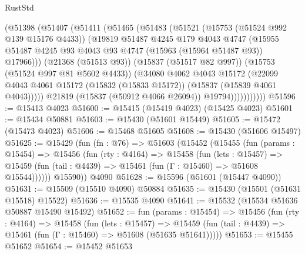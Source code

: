 \begin{lexlean}{RustStd}
\begin{coremodule}
                  (@51398
                    (@51407
                      (@51411
                        (@51465
                          (@51483
                            (@51521
                              (@15753 (@51524 @992 @139 @15176 @4433))
                              (@19819
                                @51487
                                @4245
                                @179
                                @4043
                                @4747
                                (@15955
                                  @51487
                                  @4245
                                  @93
                                  @4043
                                  @93
                                  @4747
                                  (@15963 (@15964 @51487 @93))
                                  @17966)))
                            (@21368 (@51513 @93))
                            (@15837 (@51517 @82 @997))
                            (@15753 (@51524 @997 @81 @5602 @4433))
                            (@34080
                              @4062
                              @4043
                              @15172
                              (@22099
                                @4043
                                @4061
                                @15172
                                (@15832 (@15833 @15172))
                                (@15837 (@15839 @4061 @4043)))))
                          @21819
                          (@15837 (@50912 @4066 @26094))
                          @19794)))))))))))
@51596 := @15413 @4023
@51600 := @15415 (@15419 @4023) (@15425 @4023)
@51601 := @15434 @50881
@51603 := @15430 (@51601 @15449)
@51605 := @15472 (@15473 @4023)
@51606 := @15468 @51605
@51608 := @15430 (@51606 @15497)
@51625 := @15429
    (fun (fn : @76) =>
    @51603
      (@15452
        (@15455
          (fun (params : @15454) =>
          @15456
            (fun (rty : @4164) =>
            @15458
              (fun (lets : @15457) =>
              @15459 (fun (tail : @4439) => @15461 (fun (Γ : @15460) => @51608 @15544))))))
        @15590))
    @4090
@51628 := @15596 (@51601 (@15447 @4090))
@51631 := @15509 (@15510 @4090) @50884
@51635 := @15430 (@15501 (@51631 @15518) @15522)
@51636 := @15535 @4090
@51641 := @15532 (@15534 @51636 @50887 @15490 @15492)
@51652 := fun (params : @15454) =>
  @15456
    (fun (rty : @4164) =>
    @15458
      (fun (lets : @15457) =>
      @15459 (fun (tail : @4439) => @15461 (fun (Γ : @15460) => @51608 (@51635 @51641)))))
@51653 := @15455 @51652
@51654 := @15452 @51653

\end{coremodule}
\end{lexlean}
